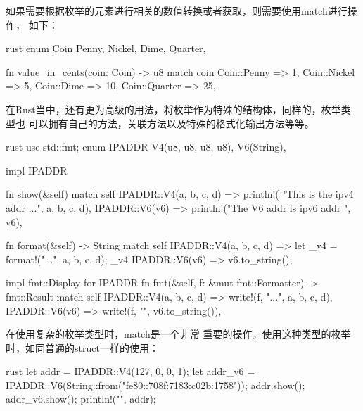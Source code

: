 如果需要根据枚举的元素进行相关的数值转换或者获取，则需要使用match进行操作，
如下：
\begin{code-block}{rust}
enum Coin {
    Penny,
    Nickel,
    Dime,
    Quarter,
}

fn value_in_cents(coin: Coin) -> u8 {
    match coin {
        Coin::Penny => 1,
        Coin::Nickel => 5,
        Coin::Dime => 10,
        Coin::Quarter => 25,
    }
}
\end{code-block}

在Rust当中，还有更为高级的用法，将枚举作为特殊的结构体，同样的，枚举类型也
可以拥有自己的方法，关联方法以及特殊的格式化输出方法等等。
\begin{code-block}{rust}
use std::fmt;
enum IPADDR {
    V4(u8, u8, u8, u8),
    V6(String),
}

impl IPADDR {
    fn show(&self) {
        match self {
            IPADDR::V4(a, b, c, d) => println!(
                "This is the ipv4 addr {}.{}.{}.{}", a, b, c, d),
            IPADDR::V6(v6) => println!("The V6 addr is ipv6 addr {}", v6),
        }
    }

    fn format(&self) -> String {
        match self {
            IPADDR::V4(a, b, c, d) => {
                let _v4 = format!("{}.{}.{}.{}", a, b, c, d);
                _v4
            }
            IPADDR::V6(v6) => v6.to_string(),
        }
    }
}

impl fmt::Display for IPADDR {
    fn fmt(&self, f: &mut fmt::Formatter) -> fmt::Result {
        match self {
            IPADDR::V4(a, b, c, d) => write!(f, "{}.{}.{}.{}", a, b, c, d),
            IPADDR::V6(v6) => write!(f, "{}", v6.to_string()),
        }
    }
}
\end{code-block}
在使用复杂的枚举类型时，match是一个非常
重要的操作。使用这种类型的枚举时，如同普通的struct一样的使用：
\begin{code-block}{rust}
let addr = IPADDR::V4(127, 0, 0, 1);
let addr_v6 = IPADDR::V6(String::from("fe80::708f:7183:c02b:1758"));
addr.show();
addr_v6.show();
println!("{}", addr);
\end{code-block}


